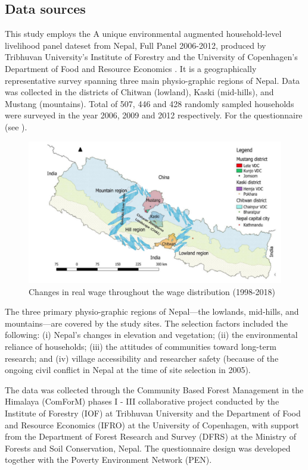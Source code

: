 \subsection{Data sources}
This study employs the A unique environmental augmented household-level livelihood panel dateset \citep{walelign2022unique} from
Nepal, Full Panel 2006-2012, produced by Tribhuvan University’s Institute of Forestry and the University of Copenhagen’s Department of Food and Resource Economics . It is a geographically representative survey spanning three main physio-graphic regions of Nepal. Data was collected in the districts of Chitwan (lowland), Kaski (mid-hills), and Mustang (mountains). Total of 507, 446 and 428 randomly sampled households were surveyed in the year 2006, 2009 and 2012 respectively. For the questionnaire (see \cite{larsen2014role}). \par

\begin{figure}[htb] 
	\centering
	\includegraphics[scale=0.31]{./figure/Study site}
	\caption{Changes in real wage throughout the wage distribution (1998-2018)}
	\label{fig:wagechangeAll}
\end{figure} 

The three primary physio-graphic regions of Nepal—the lowlands, mid-hills, and mountains—are covered by the study sites. The selection factors included the following: (i) Nepal's changes in elevation and vegetation; (ii) the environmental reliance of households; (iii) the attitudes of communities toward long-term research; and (iv) village accessibility and researcher safety (because of the ongoing civil conflict in Nepal at the time of site selection in 2005).\par
The data was collected through the Community Based Forest Management in the Himalaya
(ComForM) phases I - III collaborative project conducted by the Institute of Forestry (IOF) at Tribhuvan University and the Department of Food and Resource Economics (IFRO) at the University
of Copenhagen, with support from the Department of Forest Research and Survey (DFRS) at the
Ministry of Forests and Soil Conservation, Nepal. The questionnaire design was developed together with the Poverty Environment Network (PEN).\par  

 
                            
